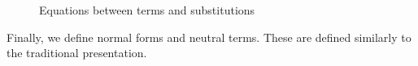 \begin{defn}[Convertibility]
\begin{figure}[t!]
\caption{Equations between terms and substitutions}
\label{fig:stlc2-equations}
\end{figure}
\end{defn}


Finally, we define normal forms and neutral terms. These are defined similarly to the traditional presentation.

